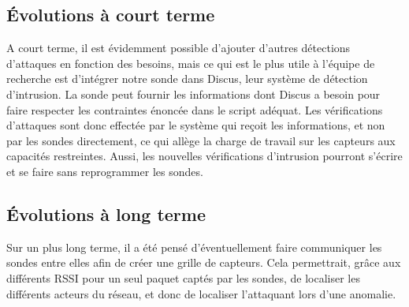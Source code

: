 	\subsection{Évolutions à court terme} %
	A court terme, il est évidemment possible d'ajouter d'autres détections d'attaques en fonction des besoins, mais ce qui est le plus utile à l'équipe de recherche est d'intégrer notre sonde dans Discus, leur système de détection d'intrusion.
	La sonde peut fournir les informations dont Discus a besoin pour faire respecter les contraintes énoncée dans le script adéquat. 
	Les vérifications d'attaques sont donc effectée par le système qui reçoit les informations, et non par les sondes directement, ce qui allège la charge de travail sur les capteurs aux capacités restreintes. Aussi, les nouvelles vérifications d'intrusion pourront s'écrire et se faire sans reprogrammer les sondes.
	\subsection{Évolutions à long terme} %
	Sur un plus long terme, il a été pensé d'éventuellement faire communiquer les sondes entre elles afin de créer une grille de capteurs.
	Cela permettrait, grâce aux différents RSSI pour un seul paquet captés par les sondes, de localiser les différents acteurs du réseau, et donc de localiser l'attaquant lors d'une anomalie.
